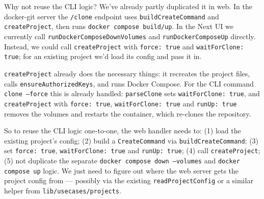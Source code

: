 \smallskip

\begin{decodedanswerpanel}
Why not reuse the CLI logic? We've already partly duplicated it in web. In the docker-git
server the \texttt{/clone} endpoint uses \texttt{buildCreateCommand} and
\texttt{createProject}, then runs \texttt{docker compose build/up}. In the Next UI we
currently call \texttt{runDockerComposeDownVolumes} and \texttt{runDockerComposeUp} directly.
Instead, we could call \texttt{createProject} with \texttt{force: true} and
\texttt{waitForClone: true}; for an existing project we'd load its config and pass it in.

\texttt{createProject} already does the necessary things: it recreates the project files,
calls \texttt{ensureAuthorizedKeys}, and runs Docker Compose. For the CLI command
\texttt{clone --force} this is already handled: \texttt{parseClone} sets
\texttt{waitForClone: true}, and \texttt{createProject} with \texttt{force: true},
\texttt{waitForClone: true} and \texttt{runUp: true} removes the volumes and restarts the
container, which re-clones the repository.

So to reuse the CLI logic one-to-one, the web handler needs to: (1) load the existing
project's config; (2) build a \texttt{CreateCommand} via \texttt{buildCreateCommand}; (3) set
\texttt{force: true}, \texttt{waitForClone: true} and \texttt{runUp: true}; (4) call
\texttt{createProject}; (5) not duplicate the separate \texttt{docker compose down --volumes}
and \texttt{docker compose up} logic. We just need to figure out where the web server gets
the project config from --- possibly via the existing \texttt{readProjectConfig} or a similar
helper from \texttt{lib/usecases/projects}.
\end{decodedanswerpanel}

